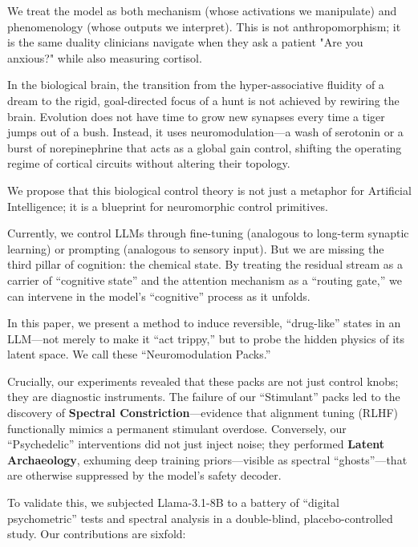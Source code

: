 \documentclass[10pt, twocolumn]{article}
\begin{document}
We treat the model as both mechanism (whose activations we manipulate) and phenomenology (whose outputs we interpret). This is not anthropomorphism; it is the same duality clinicians navigate when they ask a patient "Are you anxious?" while also measuring cortisol.

In the biological brain, the transition from the hyper-associative fluidity of a dream to the rigid, goal-directed focus of a hunt is not achieved by rewiring the brain. Evolution does not have time to grow new synapses every time a tiger jumps out of a bush. Instead, it uses neuromodulation—a wash of serotonin or a burst of norepinephrine that acts as a global gain control, shifting the operating regime of cortical circuits without altering their topology.

We propose that this biological control theory is not just a metaphor for Artificial Intelligence; it is a blueprint for neuromorphic control primitives.

Currently, we control LLMs through fine-tuning (analogous to long-term synaptic learning) or prompting (analogous to sensory input). But we are missing the third pillar of cognition: the chemical state. By treating the residual stream as a carrier of ``cognitive state'' and the attention mechanism as a ``routing gate,'' we can intervene in the model's ``cognitive'' process as it unfolds.

In this paper, we present a method to induce reversible, ``drug-like'' states in an LLM—not merely to make it ``act trippy,'' but to probe the hidden physics of its latent space. We call these ``Neuromodulation Packs.''

Crucially, our experiments revealed that these packs are not just control knobs; they are diagnostic instruments. The failure of our ``Stimulant'' packs led to the discovery of \textbf{Spectral Constriction}—evidence that alignment tuning (RLHF) functionally mimics a permanent stimulant overdose. Conversely, our ``Psychedelic'' interventions did not just inject noise; they performed \textbf{Latent Archaeology}, exhuming deep training priors—visible as spectral ``ghosts''—that are otherwise suppressed by the model's safety decoder.

To validate this, we subjected Llama-3.1-8B to a battery of ``digital psychometric'' tests and spectral analysis in a double-blind, placebo-controlled study. Our contributions are sixfold:
\end{document}
